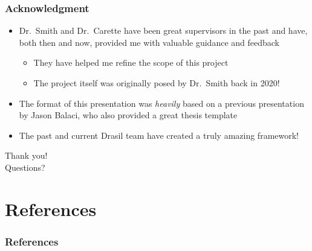 \documentclass{beamer}
\begin{document}

\begin{frame}
    \frametitle{Acknowledgment}

    \begin{itemize}
        \item Dr.~Smith and Dr.~Carette have been great supervisors in the
              past and have, both then and now, provided me with valuable guidance
              and feedback
              \begin{itemize}
                  \item They have helped me refine the scope of this project
                  \item The project itself was originally posed by Dr.~Smith back
                        in 2020!
              \end{itemize}
        \item<2-> The format of this presentation was \emph{heavily} based on
              a previous presentation by Jason Balaci, who also provided a
              great thesis template
        \item<3-> The past and current Drasil team have created a truly amazing
              framework!
    \end{itemize}
\end{frame}


\begin{frame}
    \center
    \huge{Thank you!}\\
    \normalsize{Questions?}
\end{frame}


\section{References}

\begin{frame}%
    \frametitle{References}

    
\end{frame}
\end{document}
